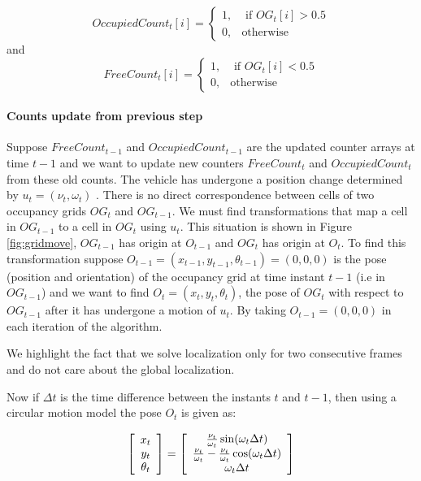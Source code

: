 \begin{equation}
OccupiedCount_t[i] =  \begin{cases} 1, & \mbox{ if $OG_t[i] > 0.5$} \\
                       0, & \mbox{otherwise} \end{cases}
\end{equation}
and
\begin{equation}
FreeCount_t[i] = \begin{cases} 1, & \mbox{ if $OG_t[i] < 0.5$} \\
                       0, & \mbox{otherwise} \end{cases}
\end{equation}

\paragraph{Counts update from previous step} Suppose $FreeCount_{t-1}$ and  $OccupiedCount_{t-1}$ are the
updated counter arrays at time $t-1$ and we want to update new counters $FreeCount_t$ and $OccupiedCount_t$
from these old counts. The vehicle has undergone a position change determined by $u_t=(\nu_t, \omega_t)$
. There is no direct correspondence between cells of two occupancy grids $OG_t$ and $OG_{t-1}$. We
must find transformations that map a cell in  $OG_{t-1}$ to a cell in $OG_{t}$ using $u_t$. This situation is
shown in Figure \ref{fig:gridmove}, $OG_{t-1}$ has origin at $O_{t-1}$ and $OG_t$ has origin at $O_t$. To find this transformation suppose $O_{t-1}=(x_{t-1}, y_{t-1}, \theta_{t-1}) = (0,0,0)$ is the pose (position and orientation) of the occupancy grid at time instant $t-1$ (i.e in $OG_{t-1}$) and we want to find $O_t=(x_t, y_t, \theta_t)$, the pose of $OG_t$ with respect to $OG_{t-1}$ after it has undergone a motion of $u_t$. By taking $O_{t-1}=(0,0,0)$ in each iteration of the algorithm.

We highlight the fact that we solve localization only for two consecutive frames and do not care about the global localization. 

Now if $\Delta t$ is the time difference between the instants $t$ and $t-1$, then using a circular motion model the pose $O_t$ is given as:

\begin{equation}
\left[\begin{array}{c}x_t \\ y_t\\ \theta_t \end{array} \right] = 
\left[\begin{array}{c} {\nu_t \over \omega_t} \sin(\omega_t \Delta t) \\ {\nu_t \over \omega_t} - {\nu_t \over \omega_t} \cos(\omega_t \Delta t) \\ \omega_t \Delta t \end{array}\right]
\label{eq:circularmotion}
\end{equation}

